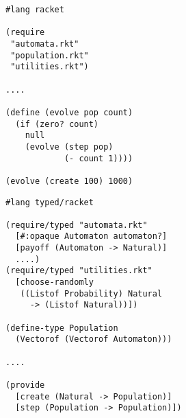 \begin{minipage}[t]{0.5\textwidth}
\flushleft
\begin{verbatim}
#lang racket

(require
 "automata.rkt"
 "population.rkt"
 "utilities.rkt")

....

(define (evolve pop count)
  (if (zero? count)
    null
    (evolve (step pop)
            (- count 1))))

(evolve (create 100) 1000)
\end{verbatim}
\end{minipage}%
\begin{minipage}[t]{0.4\textwidth}
  \flushleft
  \begin{verbatim}
#lang typed/racket

(require/typed "automata.rkt"
  [#:opaque Automaton automaton?]
  [payoff (Automaton -> Natural)]
  ....)
(require/typed "utilities.rkt"
  [choose-randomly
   ((Listof Probability) Natural
     -> (Listof Natural))])

(define-type Population
  (Vectorof (Vectorof Automaton)))

....

(provide
  [create (Natural -> Population)]
  [step (Population -> Population)])
\end{verbatim}
\end{minipage}
